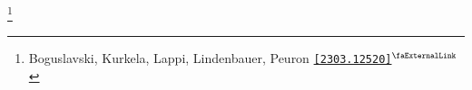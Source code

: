 \documentclass[aspectratio=169,11pt,usenames,dvipsnames]{beamer}
\renewcommand{\thefootnote}{\color{customblue}\faPaperPlaneO}
\newcommand\blfootnote[1]{%
  \begingroup
  \renewcommand\thefootnote{}\footnote{#1}%
  \addtocounter{footnote}{-1}%
  \endgroup
}
\begin{document}
\begin{frame}[noframenumbering]
\begin{columns}[onlytextwidth,t]
\begin{figure}[!hbt]
        \end{figure}
    \end{columns}   
    \blfootnote{\scriptsize Boguslavski, Kurkela, Lappi, Lindenbauer, Peuron \href{https://arxiv.org/abs/2303.12520}{{\color{ForestGreen}\texttt{[2303.12520]}$^\text{\scalebox{0.9}{\faExternalLink}}$}}}
\end{frame}


\end{document}
